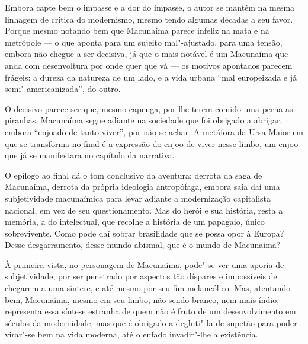 Embora capte bem o impasse e a dor do impasse, o autor se mantém na
mesma linhagem de crítica do modernismo, mesmo tendo algumas décadas a
seu favor. Porque mesmo notando bem que Macunaíma parece infeliz na mata
e na metrópole --- o que aponta para um sujeito mal"-ajustado, para uma
tensão, embora não chegue a ser decisiva, já que o mais notável é um
Macunaíma que anda com desenvoltura por onde quer que vá --- os motivos
apontados parecem frágeis: a dureza da natureza de um lado, e a vida
urbana ``mal europeizada e já semi"-americanizada'', do outro.

O decisivo parece ser que, mesmo capenga, por lhe terem comido uma perna
as piranhas, Macunaíma segue adiante na sociedade que foi obrigado a
abrigar, embora ``enjoado de tanto viver'', por não se achar. A metáfora
da Ursa Maior em que se transforma no final é a expressão do enjoo de
viver nesse limbo, um enjoo que já se manifestara no capítulo  da
narrativa.

O epílogo ao final dá o tom conclusivo da aventura: derrota da saga de
Macunaíma, derrota da própria ideologia antropófaga, embora saia daí uma
subjetividade macunaímica para levar adiante a modernização capitalista
nacional, em vez de seu questionamento. Mas do herói e sua história,
resta a memória, a do intelectual, que recolhe a história de um
papagaio, único sobrevivente. Como pode daí sobrar brasilidade que se
possa opor à Europa? Desse desgarramento, desse mundo abismal, que é o
mundo de Macunaíma?

À primeira vista, no personagem de Macunaíma, pode"-se ver uma aporia de
subjetividade, por ser penetrado por aspectos tão díspares e impossíveis
de chegarem a uma síntese, e até mesmo por seu fim melancólico. Mas,
atentando bem, Macunaíma, mesmo em seu limbo, não sendo branco, nem mais
índio, representa essa síntese estranha de quem não é fruto de um
desenvolvimento em séculos da modernidade, mas que é obrigado a
degluti"-la de supetão para poder virar"-se bem na vida moderna, até o
enfado invadir"-lhe a existência.

